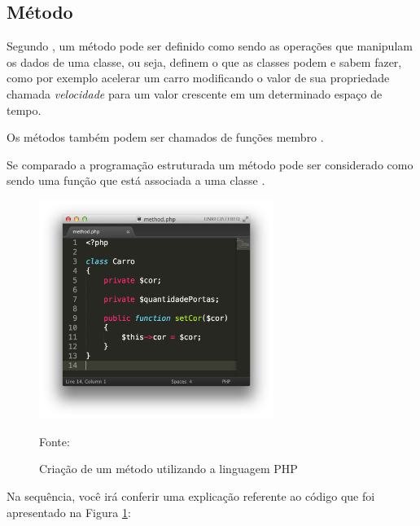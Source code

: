 \subsection{Método}

Segundo , um
método pode ser definido como sendo as operações que manipulam os dados de uma
classe, ou seja, definem o que as classes podem e sabem fazer, como por exemplo
acelerar um carro modificando o valor de sua propriedade chamada
\textit{velocidade} para um valor crescente em um determinado espaço de tempo.

Os métodos também podem ser chamados de funções membro \cite{c++ComoProgramar}.

Se comparado a programação estruturada um método pode ser considerado como sendo
uma função que está associada a uma classe \cite{programmingPhp}.

\begin{figure}[h!tb]
	\caption{Criação de um método utilizando a linguagem PHP}
	\label{fig:metodo}

	\centering
	\includegraphics[width=0.68\textwidth]{images/method.png}

	\centering
	\footnotesize Fonte: \fonteOAutor
\end{figure}

\FloatBarrier 	%

Na sequência, você irá conferir uma explicação referente ao código que foi
apresentado na Figura \ref{fig:metodo}:

